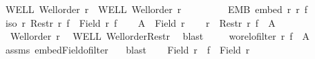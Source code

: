 \begin{isabellebody}
\ WELL{\isacharcolon}{\kern0pt}\ {\isachardoublequoteopen}Well{\isacharunderscore}{\kern0pt}order\ r{\isachardoublequoteclose}\ \ WELL{\isacharprime}{\kern0pt}{\isacharcolon}{\kern0pt}\ {\isachardoublequoteopen}Well{\isacharunderscore}{\kern0pt}order\ r{\isacharprime}{\kern0pt}{\isachardoublequoteclose}\ \isanewline
\ \ \ \ \ \ \ \ EMB{\isacharcolon}{\kern0pt}\ {\isachardoublequoteopen}embed\ r{\isacharprime}{\kern0pt}\ r\ f{\isachardoublequoteclose}\isanewline
{}\ {\isachardoublequoteopen}iso\ r{\isacharprime}{\kern0pt}\ {\isacharparenleft}{\kern0pt}Restr\ r\ {\isacharparenleft}{\kern0pt}f\ {\isacharbackquote}{\kern0pt}\ {\isacharparenleft}{\kern0pt}Field\ r{\isacharprime}{\kern0pt}{\isacharparenright}{\kern0pt}{\isacharparenright}{\kern0pt}{\isacharparenright}{\kern0pt}\ f{\isachardoublequoteclose}\isanewline
%
\isadelimproof
%
\endisadelimproof
%
\isatagproof
{}\isamarkupfalse%
{\isacharminus}{\kern0pt}\isanewline
\ \ \isamarkupfalse%
\ {\isacharquery}{\kern0pt}A{\isacharprime}{\kern0pt}\ {\isacharequal}{\kern0pt}\ {\isachardoublequoteopen}Field\ r{\isacharprime}{\kern0pt}{\isachardoublequoteclose}\isanewline
\ \ \isamarkupfalse%
\ {\isacharquery}{\kern0pt}r{\isacharprime}{\kern0pt}{\isacharprime}{\kern0pt}\ {\isacharequal}{\kern0pt}\ {\isachardoublequoteopen}Restr\ r\ {\isacharparenleft}{\kern0pt}f\ {\isacharbackquote}{\kern0pt}\ {\isacharquery}{\kern0pt}A{\isacharprime}{\kern0pt}{\isacharparenright}{\kern0pt}{\isachardoublequoteclose}\isanewline
\ \ \isamarkupfalse%
\ {}{\isacharcolon}{\kern0pt}\ {\isachardoublequoteopen}Well{\isacharunderscore}{\kern0pt}order\ {\isacharquery}{\kern0pt}r{\isacharprime}{\kern0pt}{\isacharprime}{\kern0pt}{\isachardoublequoteclose}\ \isamarkupfalse%
\ WELL\ Well{\isacharunderscore}{\kern0pt}order{\isacharunderscore}{\kern0pt}Restr\ \isamarkupfalse%
\ blast\isanewline
\ \ \isamarkupfalse%
\ {}{\isacharcolon}{\kern0pt}\ {\isachardoublequoteopen}wo{\isacharunderscore}{\kern0pt}rel{\isachardot}{\kern0pt}ofilter\ r\ {\isacharparenleft}{\kern0pt}f\ {\isacharbackquote}{\kern0pt}\ {\isacharquery}{\kern0pt}A{\isacharprime}{\kern0pt}{\isacharparenright}{\kern0pt}{\isachardoublequoteclose}\ \isamarkupfalse%
\ assms\ embed{\isacharunderscore}{\kern0pt}Field{\isacharunderscore}{\kern0pt}ofilter\ \ \isamarkupfalse%
\ blast\isanewline
\ \ \isamarkupfalse%
\ {\isachardoublequoteopen}Field\ {\isacharquery}{\kern0pt}r{\isacharprime}{\kern0pt}{\isacharprime}{\kern0pt}\ {\isacharequal}{\kern0pt}\ f\ {\isacharbackquote}{\kern0pt}\ {\isacharparenleft}{\kern0pt}Field\ r{\isacharprime}{\kern0pt}{\isacharparenright}{\kern0pt}{\isachardoublequoteclose}\ \isamarkupfalse%

\end{isabellebody}
